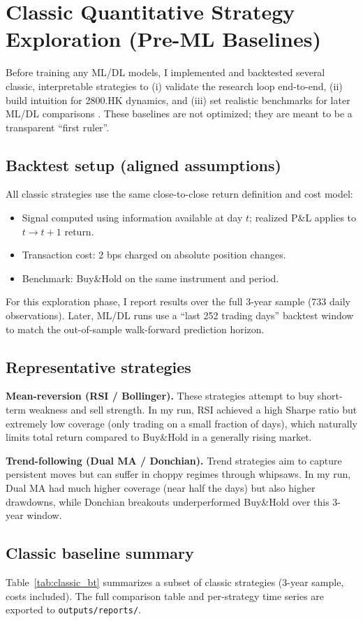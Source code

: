\documentclass[letterpaper]{article} %
\begin{document}
\section{Classic Quantitative Strategy Exploration (Pre-ML Baselines)}
Before training any ML/DL models, I implemented and backtested several classic, interpretable strategies to (i) validate the research loop end-to-end, (ii) build intuition for 2800.HK dynamics, and (iii) set realistic benchmarks for later ML/DL comparisons \citep{chan2013}. These baselines are not optimized; they are meant to be a transparent ``first ruler''.

\subsection{Backtest setup (aligned assumptions)}
All classic strategies use the same close-to-close return definition and cost model:
\begin{itemize}
  \item Signal computed using information available at day $t$; realized P\&L applies to $t\rightarrow t{+}1$ return.
  \item Transaction cost: 2 bps charged on absolute position changes.
  \item Benchmark: Buy\&Hold on the same instrument and period.
\end{itemize}
For this exploration phase, I report results over the full 3-year sample (733 daily observations). Later, ML/DL runs use a ``last 252 trading days'' backtest window to match the out-of-sample walk-forward prediction horizon.

\subsection{Representative strategies}
\textbf{Mean-reversion (RSI / Bollinger).} These strategies attempt to buy short-term weakness and sell strength. In my run, RSI achieved a high Sharpe ratio but extremely low coverage (only trading on a small fraction of days), which naturally limits total return compared to Buy\&Hold in a generally rising market.

\textbf{Trend-following (Dual MA / Donchian).} Trend strategies aim to capture persistent moves but can suffer in choppy regimes through whipsaws. In my run, Dual MA had much higher coverage (near half the days) but also higher drawdowns, while Donchian breakouts underperformed Buy\&Hold over this 3-year window.

\subsection{Classic baseline summary}
Table~\ref{tab:classic_bt} summarizes a subset of classic strategies (3-year sample, costs included). The full comparison table and per-strategy time series are exported to \texttt{outputs/reports/}.
\end{document}
